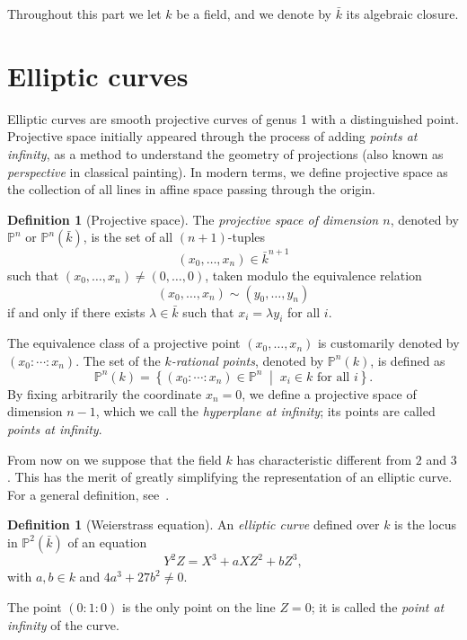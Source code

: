 \documentclass[10pt]{article}
\theoremstyle{plain}
\theoremstyle{definition}
\newtheorem{definition}[theorem]{Definition}
\def\P{\ensuremath{\mathbb{P}}}
\begin{document}
Throughout this part we let $k$ be a field, and we denote by $\bar{k}$
its algebraic closure. %

\section{Elliptic curves}
\label{sec:elliptic-curves}

Elliptic curves are smooth projective curves of genus 1 with a
distinguished point. %
Projective space initially appeared through the process of adding
\emph{points at infinity}, as a method to understand the geometry of
projections (also known as \emph{perspective} in classical
painting). %
In modern terms, we define projective space as the collection of all
lines in affine space passing through the origin.

\begin{definition}[Projective space]
  The \emph{projective space of dimension $n$}, denoted by $\P^n$ or
  $\P^n(\bar{k})$, is the set of all $(n+1)$-tuples
  \[(x_0,\dots,x_n) ∈ \bar{k}^{n+1}\] %
  such that $(x_0,\dots,x_n) ≠ (0,\dots,0)$, taken modulo the
  equivalence relation
  \[(x_0,\dots,x_n) \sim (y_0,\dots,y_n)\] %
  if and only if there exists $λ\in\bar{k}$ such that
  $x_i=λy_i$ for all $i$.
\end{definition}

The equivalence class of a projective point $(x_0,\dots,x_n)$ is
customarily denoted by $(x_0:\cdots:x_n)$. %
The set of the \emph{$k$-rational points}, denoted by $\P^n(k)$, is
defined as
\[\P^n(k) = \left\{(x_0:\cdots:x_n)∈\P^n\;\middle|\; x_i ∈ k \text{ for all $i$}\right\}.\] %
By fixing arbitrarily the coordinate $x_n=0$, we define a projective
space of dimension $n-1$, which we call the \emph{hyperplane at
  infinity}; its points are called \emph{points at infinity}.

From now on we suppose that the field $k$ has characteristic different
from $2$ and $3$. %
This has the merit of greatly simplifying the representation of an
elliptic curve. %
For a general definition, see~\cite[Chap.~III]{silverman:elliptic}.

\begin{definition}[Weierstrass equation]
  An \emph{elliptic curve} defined over $k$ is the locus in
  $\P^2(\bar{k})$ of an equation
  \begin{equation}
    \label{eq:weierstrass}
    Y^2Z = X^3 + aXZ^2 + bZ^3,    
  \end{equation}
  with $a,b∈k$ and $4a^3+27b^2\ne0$.

  The point $(0:1:0)$ is the only point on the line $Z=0$; it is
  called the \emph{point at infinity} of the curve.
\end{definition}
\end{document}
